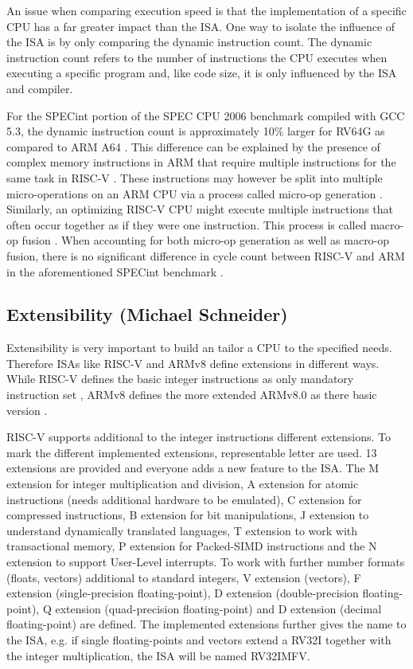 \documentclass[conference]{IEEEtran}
\begin{document}
	An issue when comparing execution speed is that the implementation of a specific \gls{CPU} has a far greater impact than the \gls{ISA}.
	One way to isolate the influence of the ISA is by only comparing the dynamic instruction count.
	The dynamic instruction count refers to the number of instructions the \gls{CPU} executes when executing a specific program
	and, like code size, it is only influenced by the \gls{ISA} and compiler.

	For the SPECint portion of the SPEC CPU 2006 benchmark compiled with GCC 5.3, the dynamic instruction count is approximately
	10\% larger for RV64G as compared to ARM A64 \cite[slide 38]{Celio2016}.
	This difference can be explained by the presence of complex memory instructions in ARM that require multiple instructions
	for the same task in RISC-V \cite[slide 40]{Celio2016}.
	These instructions may however be split into multiple micro-operations on an ARM \gls{CPU} via a process called micro-op generation \cite[slide 40]{Celio2016}.
	Similarly, an optimizing RISC-V CPU might execute multiple instructions that often occur together as if they were one instruction.
	This process is called macro-op fusion \cite[slide 16]{Celio2016}.
	When accounting for both micro-op generation as well as macro-op fusion, there is no significant difference in cycle count between RISC-V and ARM
	in the aforementioned SPECint benchmark \cite[slide 38]{Celio2016}.

	\subsection{Extensibility (Michael Schneider)}\label{sec:extensibility}
Extensibility is very important to build an tailor a CPU to the specified needs. Therefore \glspl{ISA} like RISC-V and ARMv8 define extensions in different ways. While RISC-V defines the basic integer instructions as only mandatory instruction set \cite{Waterman2017}, ARMv8 defines the more extended ARMv8.0 as there basic version \cite{Arm2020}.

RISC-V supports additional to the integer instructions different extensions. To mark the different implemented extensions, representable letter are used. 13 extensions are provided and everyone adds a new feature to the \gls{ISA}. The M extension for integer multiplication and division, A extension for atomic instructions (needs additional hardware to be emulated), C extension for compressed instructions, B extension for bit manipulations, J extension to understand dynamically translated languages, T extension to work with transactional memory, P extension for Packed-SIMD instructions and the N extension to support User-Level interrupts. To work with further number formats (floats, vectors) additional to standard integers, V extension (vectors), F extension (single-precision floating-point), D extension (double-precision floating-point), Q extension (quad-precision floating-point) and D extension (decimal floating-point) are defined. The implemented extensions further gives the name to the \gls{ISA}, e.g. if single floating-points and vectors extend a RV32I together with the integer multiplication, the \gls{ISA} will be named RV32IMFV. \cite{Waterman2017}
\end{document}
